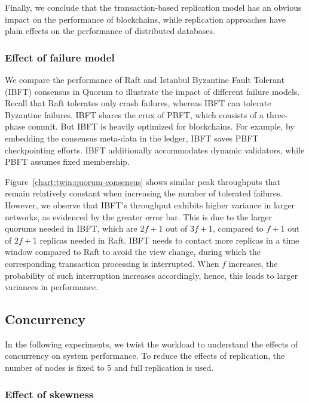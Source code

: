 Finally, we conclude that the transaction-based replication model has an obvious
impact on the performance of blockchains, while replication approaches have plain
effects on the performance of distributed databases.

\subsubsection{Effect of failure model}
\label{ch:twin:exp:replication:consensus}
We compare the performance of Raft and Istanbul Byzantine Fault Tolerant (IBFT)
consensus in Quorum to illustrate the impact of different failure models.
Recall that Raft tolerates only crash failures, whereas IBFT can tolerate
Byzantine failures.
IBFT shares the crux of PBFT, which consists of a three-phase commit.
But IBFT is heavily optimized for blockchains.
For example, by embedding the consensus meta-data in the ledger, IBFT saves PBFT
checkpointing efforts.
IBFT additionally accommodates dynamic validators, while PBFT assumes fixed
membership.


Figure~\ref{chart:twin:quorum-consensus} shows similar peak throughputs that remain
relatively constant when increasing the number of tolerated failures.
However, we observe that IBFT's throughput exhibits higher variance in larger
networks, as evidenced by the greater error bar. This is due to the larger
quorums needed in IBFT, which are $2f+1$ out of $3f+1$, compared to $f+1$ out of
$2f+1$ replicas needed in Raft.
IBFT needs to contact more replicas in a time window compared to Raft to avoid
the view change, during which the corresponding transaction processing is
interrupted.
When $f$ increases, the probability of such interruption increases accordingly,
hence, this leads to larger variances in performance.

\subsection{Concurrency} 
\label{ch:twin:exp:concurrency}
In the following experiments, we twist the workload to understand the effects of
concurrency on system performance.
To reduce the effects of replication, the number of nodes is fixed to 5 and full
replication is used.

\subsubsection{Effect of skewness}

